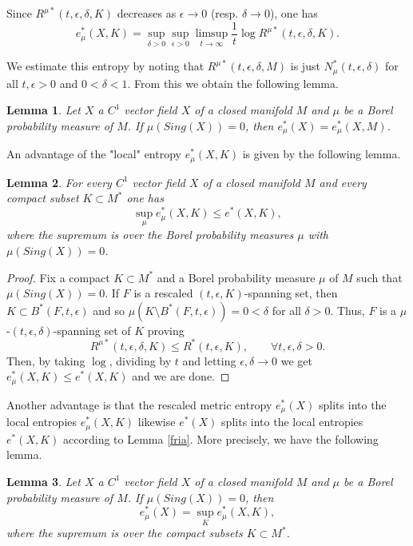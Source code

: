 \documentclass{amsart}
\newtheorem{lem}{Lemma}
\numberwithin{equation}{section}
\begin{document}
Since $R^{\mu*}(t,\epsilon,\delta,K)$ decreases as $\epsilon\to0$ (resp. $\delta\to0$), one has
\begin{equation}
\label{gatuso}
e^*_\mu(X,K)=\sup_{\delta>0}\sup_{\epsilon>0}\limsup_{t\to\infty}\frac{1}t\log R^{\mu*}(t,\epsilon,\delta,K).
\end{equation}

We estimate this entropy by noting that $R^{\mu*}(t,\epsilon,\delta,M)$ is just $N^*_\mu(t,\epsilon,\delta)$ for all $t,\epsilon>0$ and $0<\delta<1$.
From this we obtain the following lemma.

\begin{lem}
\label{babel}
Let $X$ a $C^1$ vector field $X$ of a closed manifold $M$ and $\mu$ be a Borel probability measure of $M$. If $\mu(Sing(X))=0$, then
$e^*_\mu(X)=e^*_\mu(X,M)$.
\end{lem}

An advantage of the "local" entropy $e^*_\mu(X,K)$ is given by the following lemma.

\begin{lem}
\label{short}
For every $C^1$ vector field $X$ of a closed manifold $M$ and every compact subset $K\subset M^*$ one has
$$
\sup_\mu e^*_\mu(X,K)\leq e^*(X,K),
$$
where the supremum is over the Borel probability measures $\mu$ with $\mu(Sing(X))=0$.
\end{lem}

\begin{proof}
Fix a compact $K\subset M^*$ and a Borel probability measure $\mu$ of $M$ such that $\mu(Sing(X))=0$.
If $F$ is a rescaled $(t,\epsilon,K)$-spanning set, then
$K\subset B^*(F,t,\epsilon)$ and so $\mu(K\setminus B^*(F,t,\epsilon))=0<\delta$
for all $\delta>0$.
Thus, $F$ is a $\mu$-$(t,\epsilon,\delta)$-spanning set of $K$
proving
$$
R^{\mu*}(t,\epsilon,\delta,K)\leq R^*(t,\epsilon,K),\quad\quad\forall t,\epsilon,\delta>0.
$$
Then, by taking $\log$, dividing by $t$ and letting $\epsilon,\delta\to0$ we get
$e^*_\mu(X,K)\leq e^*(X,K)$ and we are done.
\end{proof}

Another advantage is that the rescaled metric entropy $e^*_\mu(X)$ splits into the local entropies $e^*_\mu(X,K)$ likewise $e^*(X)$ splits into the local entropies $e^*(X,K)$ according to Lemma \ref{fria}. More precisely, we have the following lemma.

\begin{lem}
\label{singar}
Let $X$ a $C^1$ vector field $X$ of a closed manifold $M$ and $\mu$ be a Borel probability measure of $M$. If $\mu(Sing(X))=0$, then
$$
e^*_\mu(X)=\sup_Ke^*_\mu(X,K),
$$
where the supremum is over the compact subsets $K\subset M^*$.
\end{lem}
\end{document}
